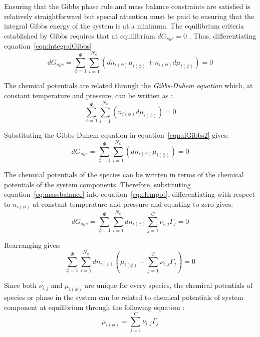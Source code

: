 		Ensuring that the Gibbs phase rule and mass balance constraints are satisfied is relatively straightforward but special attention must be paid to ensuring that the integral Gibbs energy of the system is at a minimum. The equilibrium criteria established by Gibbs requires that at equilibrium $d G_{sys} = 0$ \cite{Gibbs:1878aa}. Thus, differentiating equation~\ref{eqn:integralGibbs}
		\begin{equation}\label{eqn:dGibbs1}
			d G_{sys} = \sum_{\phi=1}^{\Phi} \sum_{i=1}^{N_{\phi}} \left( d n_{i(\phi)}\mu_{i(\phi)} + n_{i(\phi)} d \mu_{i(\phi)}\right) = 0
		\end{equation}
		
		The chemical potentials are related through the \emph{Gibbs-Duhem equation} which, at constant temperature and pressure, can be written as \cite{Olander08}:
		\begin{equation}\label{eqn:dGibbs2}
			\sum_{\phi=1}^{\Phi} \sum_{i=1}^{N_{\phi}} \left( n_{i(\phi)} d \mu_{i(\phi)}\right) = 0
		\end{equation}
		
		Substituting the Gibbs-Duhem equation in equation~\ref{eqn:dGibbs2} gives:
		\begin{equation}\label{eqn:dGibbs3}
			d G_{sys} = \sum_{\phi=1}^{\Phi} \sum_{i=1}^{N_{\phi}} \left( d n_{i(\phi)}\mu_{i(\phi)} \right) = 0
		\end{equation}
		
		The chemical potentials of the species can be written in terms of the chemical potentials of the system components. Therefore, substituting equation~\ref{eq:massbalance} into equation~\ref{eq:elempot}, differentiating with respect to $n_{i(\phi)}$ at constant temperature and pressure and equating to zero gives:
		\begin{equation}\label{eqn:dGibbs4}
			d G_{sys} = \sum_{\phi=1}^{\Phi} \sum_{i=1}^{N_{\phi}}  d n_{i(\phi)}\sum_{j=1}^{C}\nu_{i,j}\Gamma_j  = 0
		\end{equation}
		
		Rearranging gives:
		\begin{equation}\label{eqn:dGibbs5}
			\sum_{\phi=1}^{\Phi} \sum_{i=1}^{N_{\phi}}  d n_{i(\phi)} \left( \mu_{i(\phi)} - \sum_{j=1}^{C}\nu_{i,j}\Gamma_j \right) = 0
		\end{equation}
		
		Since both $\nu_{i,j}$ and $\mu_{i(\phi)}$ are unique for every species, the chemical potentials of species or phase in the system can be related to chemical potentials of system component at equilibrium through the following equation \cite{vanZeggeren11}:
		\begin{equation}\label{eqn:dGibbs6}
			\mu_{i(\phi)} = \sum_{j=1}^{C}\nu_{i,j}\Gamma_j
		\end{equation}
		
